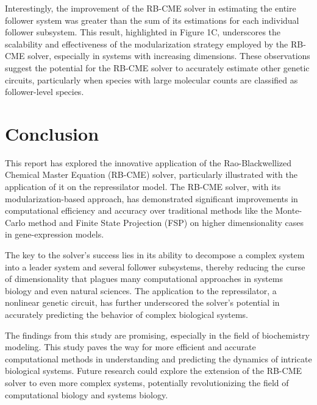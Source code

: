 \documentclass[11pt]{isr} %
\begin{document}
Interestingly, the improvement of the RB-CME solver in estimating the entire follower system was greater than the sum of its estimations for each individual follower subsystem. This result, highlighted in Figure 1C, underscores the scalability and effectiveness of the modularization strategy employed by the RB-CME solver, especially in systems with increasing dimensions. These observations suggest the potential for the RB-CME solver to accurately estimate other genetic circuits, particularly when species with large molecular counts are classified as follower-level species.

\section*{Conclusion}
This report has explored the innovative application of the Rao-Blackwellized Chemical Master Equation (RB-CME) solver, particularly illustrated with the application of it on the repressilator model. The RB-CME solver, with its modularization-based approach, has demonstrated significant improvements in computational efficiency and accuracy over traditional methods like the Monte-Carlo method and Finite State Projection (FSP) on higher dimensionality cases in gene-expression models.

The key to the solver's success lies in its ability to decompose a complex system into a leader system and several follower subsystems, thereby reducing the curse of dimensionality that plagues many computational approaches in systems biology and even natural sciences. The application to the repressilator, a nonlinear genetic circuit, has further underscored the solver’s potential in accurately predicting the behavior of complex biological systems.

The findings from this study are promising, especially in the field of biochemistry modeling. This study paves the way for more efficient and accurate computational methods in understanding and predicting the dynamics of intricate biological systems. Future research could explore the extension of the RB-CME solver to even more complex systems, potentially revolutionizing the field of computational biology and systems biology.

\newpage



\end{document}
